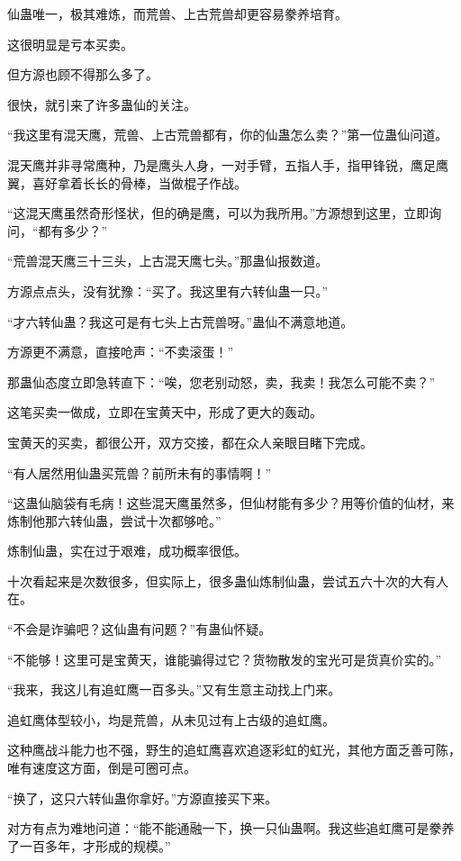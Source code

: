 \begin{this_body}
仙蛊唯一，极其难炼，而荒兽、上古荒兽却更容易豢养培育。

这很明显是亏本买卖。

但方源也顾不得那么多了。

很快，就引来了许多蛊仙的关注。

“我这里有混天鹰，荒兽、上古荒兽都有，你的仙蛊怎么卖？”第一位蛊仙问道。

混天鹰并非寻常鹰种，乃是鹰头人身，一对手臂，五指人手，指甲锋锐，鹰足鹰翼，喜好拿着长长的骨棒，当做棍子作战。

“这混天鹰虽然奇形怪状，但的确是鹰，可以为我所用。”方源想到这里，立即询问，“都有多少？”

“荒兽混天鹰三十三头，上古混天鹰七头。”那蛊仙报数道。

方源点点头，没有犹豫：“买了。我这里有六转仙蛊一只。”

“才六转仙蛊？我这可是有七头上古荒兽呀。”蛊仙不满意地道。

方源更不满意，直接呛声：“不卖滚蛋！”

那蛊仙态度立即急转直下：“唉，您老别动怒，卖，我卖！我怎么可能不卖？”

这笔买卖一做成，立即在宝黄天中，形成了更大的轰动。

宝黄天的买卖，都很公开，双方交接，都在众人亲眼目睹下完成。

“有人居然用仙蛊买荒兽？前所未有的事情啊！”

“这蛊仙脑袋有毛病！这些混天鹰虽然多，但仙材能有多少？用等价值的仙材，来炼制他那六转仙蛊，尝试十次都够呛。”

炼制仙蛊，实在过于艰难，成功概率很低。

十次看起来是次数很多，但实际上，很多蛊仙炼制仙蛊，尝试五六十次的大有人在。

“不会是诈骗吧？这仙蛊有问题？”有蛊仙怀疑。

“不能够！这里可是宝黄天，谁能骗得过它？货物散发的宝光可是货真价实的。”

“我来，我这儿有追虹鹰一百多头。”又有生意主动找上门来。

追虹鹰体型较小，均是荒兽，从未见过有上古级的追虹鹰。

这种鹰战斗能力也不强，野生的追虹鹰喜欢追逐彩虹的虹光，其他方面乏善可陈，唯有速度这方面，倒是可圈可点。

“换了，这只六转仙蛊你拿好。”方源直接买下来。

对方有点为难地问道：“能不能通融一下，换一只仙蛊啊。我这些追虹鹰可是豢养了一百多年，才形成的规模。”


\end{this_body}
